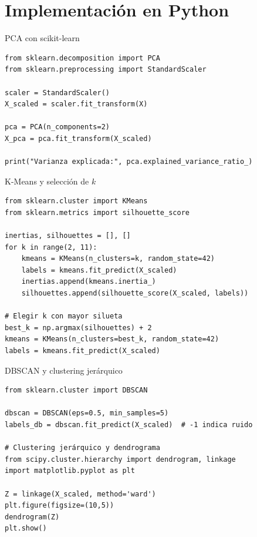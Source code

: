\documentclass[aspectratio=169, 10pt, xcolor=table]{beamer}
\begin{document}
\section{Implementación en Python}

\begin{frame}[fragile]{PCA con scikit-learn}
    \begin{lstlisting}
from sklearn.decomposition import PCA
from sklearn.preprocessing import StandardScaler

scaler = StandardScaler()
X_scaled = scaler.fit_transform(X)

pca = PCA(n_components=2)
X_pca = pca.fit_transform(X_scaled)

print("Varianza explicada:", pca.explained_variance_ratio_)
    \end{lstlisting}
\end{frame}

\begin{frame}[fragile]{K-Means y selección de $k$}
    \begin{lstlisting}
from sklearn.cluster import KMeans
from sklearn.metrics import silhouette_score

inertias, silhouettes = [], []
for k in range(2, 11):
    kmeans = KMeans(n_clusters=k, random_state=42)
    labels = kmeans.fit_predict(X_scaled)
    inertias.append(kmeans.inertia_)
    silhouettes.append(silhouette_score(X_scaled, labels))

# Elegir k con mayor silueta
best_k = np.argmax(silhouettes) + 2
kmeans = KMeans(n_clusters=best_k, random_state=42)
labels = kmeans.fit_predict(X_scaled)
    \end{lstlisting}
\end{frame}

\begin{frame}[fragile]{DBSCAN y clustering jerárquico}
    \begin{lstlisting}
from sklearn.cluster import DBSCAN

dbscan = DBSCAN(eps=0.5, min_samples=5)
labels_db = dbscan.fit_predict(X_scaled)  # -1 indica ruido

# Clustering jerárquico y dendrograma
from scipy.cluster.hierarchy import dendrogram, linkage
import matplotlib.pyplot as plt

Z = linkage(X_scaled, method='ward')
plt.figure(figsize=(10,5))
dendrogram(Z)
plt.show()
    \end{lstlisting}
\end{frame}

\end{document}
